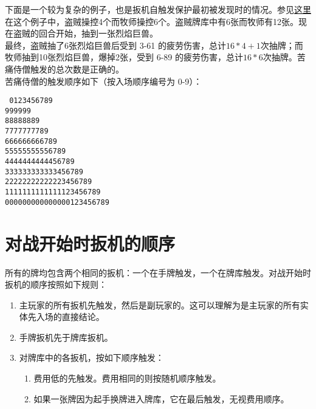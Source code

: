 下面是一个较为复杂的例子，也是扳机自触发保护最初被发现时的情况。参见\href{https://www.youtube.com/watch?v=DowBB0GhGnA}{这里}\\
在这个例子中，盗贼操控4个而牧师操控6个。盗贼牌库中有6张而牧师有12张。现在盗贼的回合开始，抽到一张烈焰巨兽。\\
最终，盗贼抽了6张烈焰巨兽后受到 3-61 的疲劳伤害，总计$16*4+1$次抽牌；而牧师抽到10张烈焰巨兽，爆掉2张，受到 6-89 的疲劳伤害，总计$16*6$次抽牌。苦痛侍僧触发的总次数是正确的。\\
苦痛侍僧的触发顺序如下（按入场顺序编号为 0-9）：
\begin{center}
    \texttt{
        0123456789\\
        999999\\
        88888889\\
        7777777789\\
        666666666789\\
        55555555556789\\
        4444444444456789\\
        333333333333456789\\
        22222222222223456789\\
        1111111111111123456789\\
        000000000000000123456789
    }
\end{center}

\section{对战开始时扳机的顺序}

所有的牌均包含两个相同的扳机：一个在手牌触发，一个在牌库触发。对战开始时扳机的顺序按照如下规则：

\begin{enumerate}
    \item 主玩家的所有扳机先触发，然后是副玩家的。这可以理解为是主玩家的所有实体先入场的直接结论。
    \item 手牌扳机先于牌库扳机。
    \item 对牌库中的各扳机，按如下顺序触发：
    \begin{enumerate}
        \item 费用低的先触发。费用相同的则按随机顺序触发。
        \item  如果一张牌因为起手换牌进入牌库，它在最后触发，无视费用顺序。
    \end{enumerate}
\end{enumerate}


